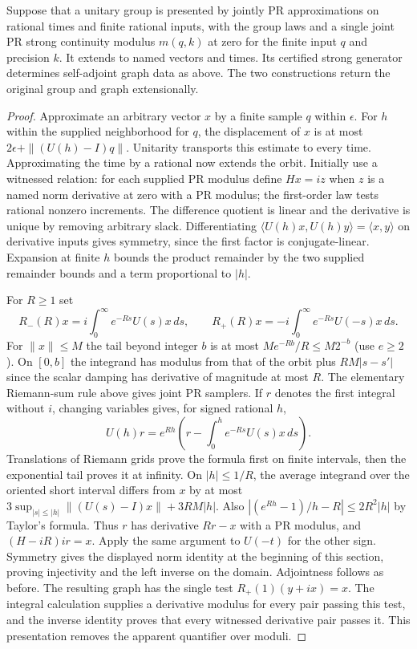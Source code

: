 \begin{theorem}\label{thm:stone-back}
Suppose that a unitary group is presented by jointly PR approximations on rational times and finite rational inputs, with the group laws and a single joint PR strong continuity modulus $m(q,k)$ at zero for the finite input $q$ and precision $k$. It extends to named vectors and times. Its certified strong generator determines self-adjoint graph data as above. The two constructions return the original group and graph extensionally.
\end{theorem}
\begin{proof}
Approximate an arbitrary vector $x$ by a finite sample $q$ within $\epsilon$. For $h$ within the supplied neighborhood for $q$, the displacement of $x$ is at most $2\epsilon+\|(U(h)-I)q\|$. Unitarity transports this estimate to every time. Approximating the time by a rational now extends the orbit. Initially use a witnessed relation: for each supplied PR modulus define $Hx=iz$ when $z$ is a named norm derivative at zero with a PR modulus; the first-order law tests rational nonzero increments. The difference quotient is linear and the derivative is unique by removing arbitrary slack. Differentiating $\langle U(h)x,U(h)y\rangle=\langle x,y\rangle$ on derivative inputs gives symmetry, since the first factor is conjugate-linear. Expansion at finite $h$ bounds the product remainder by the two supplied remainder bounds and a term proportional to $|h|$.

For $R\ge1$ set
\[
 R_-(R)x=i\int_0^\infty e^{-Rs}U(s)x\,ds,\qquad
 R_+(R)x=-i\int_0^\infty e^{-Rs}U(-s)x\,ds .
\]
For $\|x\|\le M$ the tail beyond integer $b$ is at most $Me^{-Rb}/R\le M2^{-b}$ (use $e\ge2$). On $[0,b]$ the integrand has modulus from that of the orbit plus $RM|s-s'|$ since the scalar damping has derivative of magnitude at most $R$. The elementary Riemann-sum rule above gives joint PR samplers. If $r$ denotes the first integral without $i$, changing variables gives, for signed rational $h$,
\[
 U(h)r=e^{Rh}\left(r-\int_0^h e^{-Rs}U(s)x\,ds\right).
\]
Translations of Riemann grids prove the formula first on finite intervals, then the exponential tail proves it at infinity. On $|h|\le1/R$, the average integrand over the oriented short interval differs from $x$ by at most $3\sup_{|s|\le|h|}\|(U(s)-I)x\|+3RM|h|$. Also $|(e^{Rh}-1)/h-R|\le2R^2|h|$ by Taylor's formula. Thus $r$ has derivative $Rr-x$ with a PR modulus, and $(H-iR)i r=x$. Apply the same argument to $U(-t)$ for the other sign. Symmetry gives the displayed norm identity at the beginning of this section, proving injectivity and the left inverse on the domain. Adjointness follows as before. The resulting graph has the single test $R_+(1)(y+ix)=x$. The integral calculation supplies a derivative modulus for every pair passing this test, and the inverse identity proves that every witnessed derivative pair passes it. This presentation removes the apparent quantifier over moduli.


\end{proof}
